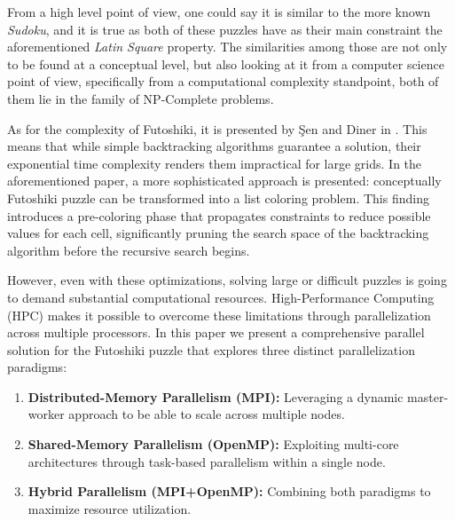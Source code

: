 From a high level point of view, one could say it is similar to the more known \textit{Sudoku}, and it is true as both of these puzzles have as their main constraint the aforementioned \textit{Latin Square} property. The similarities among those are not only to be found at a conceptual level, but also looking at it from a computer science point of view, specifically from a computational complexity standpoint, both of them lie in the family of NP-Complete problems. 

As for the complexity of Futoshiki, it is presented by Şen and Diner in \cite{Sen2024Futoshiki}. This means that while simple backtracking algorithms guarantee a solution, their exponential time complexity renders them impractical for large grids. In the aforementioned paper, a more sophisticated approach is presented: conceptually Futoshiki puzzle can be transformed into a list coloring problem. This finding introduces a pre-coloring phase that propagates constraints to reduce possible values for each cell, significantly pruning the search space of the backtracking algorithm before the recursive search begins.


However, even with these optimizations, solving large or difficult puzzles is going to demand substantial computational resources. High-Performance Computing (HPC) makes it possible to overcome these limitations through parallelization across multiple processors. In this paper we present a comprehensive parallel solution for the Futoshiki puzzle that explores three distinct parallelization paradigms:

\begin{enumerate}
    \item \textbf{Distributed-Memory Parallelism (MPI):} \cite{MPIForum2021} Leveraging a dynamic master-worker approach to be able to scale across multiple nodes.
    \item \textbf{Shared-Memory Parallelism (OpenMP):} \cite{OpenMP2020} Exploiting multi-core architectures through task-based parallelism within a single node.
    \item \textbf{Hybrid Parallelism (MPI+OpenMP):} Combining both paradigms to maximize resource utilization.
\end{enumerate}

